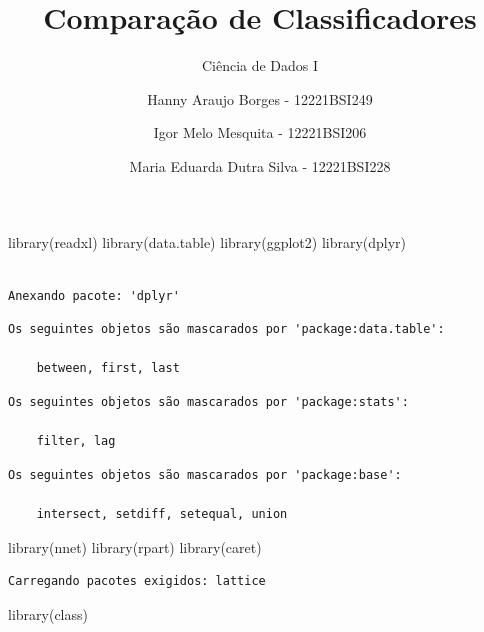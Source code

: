 \documentclass[
  letterpaper,
  DIV=11,
  numbers=noendperiod]{scrartcl}
\title{Comparação de Classificadores}
\subtitle{Ciência de Dados I}
\author{Hanny Araujo Borges - 12221BSI249 \and Igor Melo Mesquita -
12221BSI206 \and Maria Eduarda Dutra Silva - 12221BSI228}
\date{}
\newenvironment{Shaded}{\begin{snugshade}}{\end{snugshade}}
\newcommand{\FunctionTok}[1]{\textcolor[rgb]{0.28,0.35,0.67}{#1}}
\newcommand{\NormalTok}[1]{\textcolor[rgb]{0.00,0.23,0.31}{#1}}
\renewcommand*\contentsname{Índice}
\newcommand\contentsname{Índice}
\begin{document}
\maketitle

\renewcommand*\contentsname{Índice}
{
\hypersetup{linkcolor=}
\setcounter{tocdepth}{3}
\tableofcontents
}

\begin{Shaded}
\begin{Highlighting}[]
\FunctionTok{library}\NormalTok{(readxl)}
\FunctionTok{library}\NormalTok{(data.table)}
\FunctionTok{library}\NormalTok{(ggplot2)}
\FunctionTok{library}\NormalTok{(dplyr)}
\end{Highlighting}
\end{Shaded}

\begin{verbatim}

Anexando pacote: 'dplyr'
\end{verbatim}

\begin{verbatim}
Os seguintes objetos são mascarados por 'package:data.table':

    between, first, last
\end{verbatim}

\begin{verbatim}
Os seguintes objetos são mascarados por 'package:stats':

    filter, lag
\end{verbatim}

\begin{verbatim}
Os seguintes objetos são mascarados por 'package:base':

    intersect, setdiff, setequal, union
\end{verbatim}

\begin{Shaded}
\begin{Highlighting}[]
\FunctionTok{library}\NormalTok{(nnet)}
\FunctionTok{library}\NormalTok{(rpart)}
\FunctionTok{library}\NormalTok{(caret)}
\end{Highlighting}
\end{Shaded}

\begin{verbatim}
Carregando pacotes exigidos: lattice
\end{verbatim}

\begin{Shaded}
\begin{Highlighting}[]
\FunctionTok{library}\NormalTok{(class)}
\end{Highlighting}
\end{Shaded}
\end{document}
